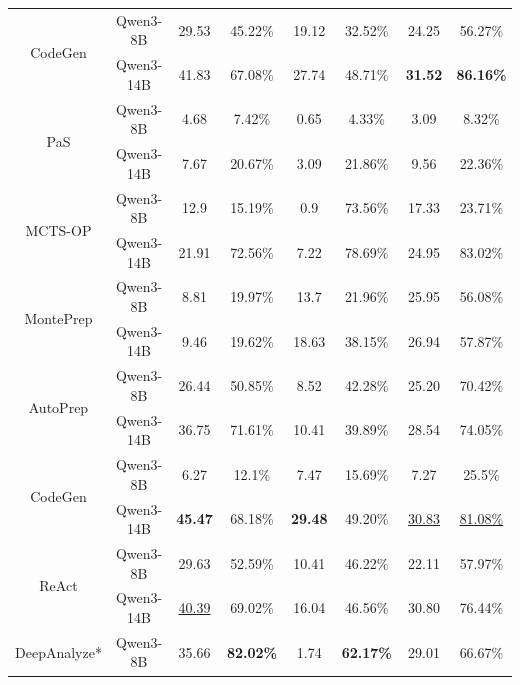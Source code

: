 \begin{table}[t]
{\begin{tabular}{|c|c||c|c||c|c|c|c|}
      \multirow{2}{*}{CodeGen} 
      & Qwen3-8B & 29.53 & 45.22\% & 19.12 & 32.52\% & 24.25 & 56.27\% \\
      & Qwen3-14B & 41.83 & 67.08\% & 27.74 & 48.71\% & \textbf{31.52} & \textbf{86.16\%} \\ \hline

      \multirow{2}{*}{PaS} 
      & Qwen3-8B & 4.68 & 7.42\% & 0.65 & 4.33\% & 3.09 & 8.32\% \\
      & Qwen3-14B & 7.67 & 20.67\% & 3.09 & 21.86\% & 9.56 & 22.36\% \\ \hline

      \multirow{2}{*}{MCTS-OP} 
      & Qwen3-8B & 12.9 & 15.19\% & 0.9 & 73.56\% & 17.33 & 23.71\% \\
      & Qwen3-14B & 21.91 & 72.56\% & 7.22 & 78.69\% & 24.95 & 83.02\% \\ \hline

      \multirow{2}{*}{MontePrep} 
      & Qwen3-8B & 8.81 & 19.97\% & 13.7 & 21.96\% & 25.95 & 56.08\% \\
      & Qwen3-14B & 9.46 & 19.62\% & 18.63 & 38.15\% & 26.94 & 57.87\% \\ \hline

      \multirow{2}{*}{AutoPrep} 
      & Qwen3-8B & 26.44 & 50.85\% & 8.52 & 42.28\% & 25.20 & 70.42\% \\
      & Qwen3-14B & 36.75 & 71.61\% & 10.41 & 39.89\% & 28.54 & 74.05\% \\ \hline

      \multirow{2}{*}{CodeGen} 
      & Qwen3-8B & 6.27 & 12.1\% & 7.47 & 15.69\% & 7.27 & 25.5\% \\
      & Qwen3-14B & \textbf{45.47} & 68.18\% & \textbf{29.48} & 49.20\% & \underline{30.83} & \underline{81.08\%} \\ \hline

      \multirow{2}{*}{ReAct} 
      & Qwen3-8B & 29.63 & 52.59\% & 10.41 & 46.22\% & 22.11 & 57.97\% \\
      & Qwen3-14B & \underline{40.39} & 69.02\% & 16.04 & 46.56\% & 30.80 & 76.44\% \\ \hline

      \multirow{1}{*}{DeepAnalyze*} 
      & Qwen3-8B & 35.66 & \textbf{82.02\%} & 1.74 & \textbf{62.17\%} & 29.01 & 66.67\% \\ \hline\hline


\end{tabular}}
\end{table}
